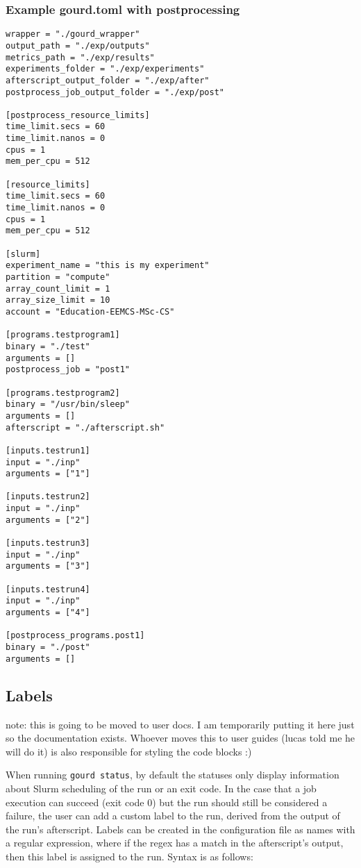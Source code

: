 \subsubsection{Example gourd.toml with postprocessing}

\begin{verbatim}
wrapper = "./gourd_wrapper"
output_path = "./exp/outputs"
metrics_path = "./exp/results"
experiments_folder = "./exp/experiments"
afterscript_output_folder = "./exp/after"
postprocess_job_output_folder = "./exp/post"

[postprocess_resource_limits]
time_limit.secs = 60
time_limit.nanos = 0
cpus = 1
mem_per_cpu = 512

[resource_limits]
time_limit.secs = 60
time_limit.nanos = 0
cpus = 1
mem_per_cpu = 512

[slurm]
experiment_name = "this is my experiment"
partition = "compute"
array_count_limit = 1
array_size_limit = 10
account = "Education-EEMCS-MSc-CS"

[programs.testprogram1]
binary = "./test"
arguments = []
postprocess_job = "post1"

[programs.testprogram2]
binary = "/usr/bin/sleep"
arguments = []
afterscript = "./afterscript.sh"

[inputs.testrun1]
input = "./inp"
arguments = ["1"]

[inputs.testrun2]
input = "./inp"
arguments = ["2"]

[inputs.testrun3]
input = "./inp"
arguments = ["3"]

[inputs.testrun4]
input = "./inp"
arguments = ["4"]

[postprocess_programs.post1]
binary = "./post"
arguments = []

\end{verbatim}

\subsection{Labels}
note: this is going to be moved to user docs.
I am temporarily putting it here just so the documentation exists.
Whoever moves this to user guides (lucas told me he will do it) is also responsible for styling the code blocks :)

When running \verb|gourd status|, by default the statuses only display information about Slurm scheduling of the run or an exit code.
In the case that a job execution can succeed (exit code 0) but the run should still be considered a failure, the user can add a custom label to the run, derived from the output of the run's afterscript.
Labels can be created in the configuration file as names with a regular expression, where if the regex has a match in the afterscript's output, then this label is assigned to the run.
Syntax is as follows:

